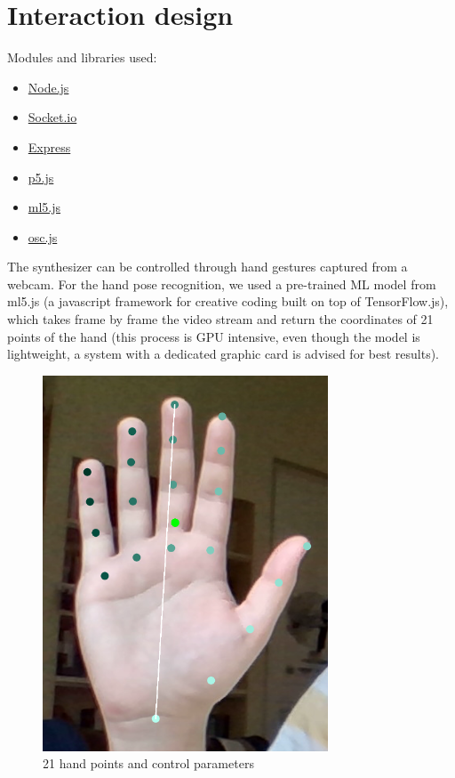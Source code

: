 \documentclass[a4paper,12pt]{report}
\begin{document}
\section{Interaction design}

Modules and libraries used:
\begin{itemize}
	\item \href{https://nodejs.org/en/}{ Node.js }
	\item \href{https://socket.io/}{ Socket.io }
	\item \href{https://expressjs.com/}{ Express }
	\item \href{https://p5js.org/}{ p5.js }
	\item\href{https://ml5js.org/}{ ml5.js }
	\item \href{https://github.com/colinbdclark/osc.js/}{ osc.js }
\end{itemize}

The synthesizer can be controlled through hand gestures captured from a webcam. For the hand pose recognition, we used a pre-trained ML model from ml5.js (a javascript framework for creative coding built on top of TensorFlow.js), which takes frame by frame the video stream and return the coordinates of 21 points of the hand (this process is GPU intensive, even though the model is lightweight, a system with a dedicated graphic card is advised for best results). 

\begin{figure}[h]
\centering
\includegraphics[scale=0.8]{hand.png}
\caption{21 hand points and control parameters}
\end{figure}
\end{document}
